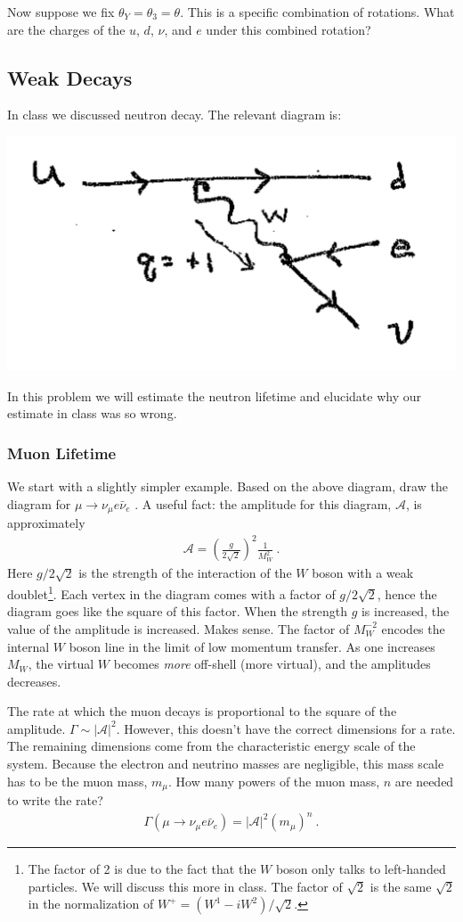 \documentclass[12pt]{article}
\begin{document}
Now suppose we fix $\theta_Y = \theta_3 =\theta$. This is a specific combination of rotations. What are the charges of the $u$, $d$, $\nu$, and $e$ under this combined rotation? 

 
\subsection{Weak Decays}

In class we discussed neutron decay. The relevant diagram is:
\begin{center}
	\includegraphics[width=.4\textwidth]{HW2b.png}
\end{center}
In this problem we will estimate the neutron lifetime and elucidate why our estimate in class was so wrong.

\subsubsection{Muon Lifetime}

We start with a slightly simpler example. Based on the above diagram, draw the diagram for $\mu \to \nu_\mu e \bar\nu_e$ . A useful fact: the amplitude for this diagram, $\mathcal A$, is approximately
\begin{align}
	\mathcal A = \left(\frac{g}{2\sqrt{2}}\right)^2 \frac{1}{M_W^2} \ .
\end{align}
Here $g/2\sqrt{2}$ is the strength of the interaction of the $W$ boson with a weak doublet\footnote{The factor of 2 is due to the fact that the $W$ boson only talks to left-handed particles. We will discuss this more in class. The factor of $\sqrt{2}$ is the same $\sqrt{2}$ in the normalization of $W^+ = (W^1 - iW^2)/\sqrt{2}$.}. Each vertex in the diagram comes with a factor of $g/2\sqrt{2}$, hence the diagram goes like the square of this factor. When the strength $g$ is increased, the value of the amplitude is increased. Makes sense. The factor of $M_W^{-2}$ encodes the internal $W$ boson line in the limit of low momentum transfer. As one increases $M_W$, the virtual $W$ becomes \emph{more} off-shell (more virtual), and the amplitudes decreases. 

The rate at which the muon decays is proportional to the square of the amplitude. $\Gamma \sim |\mathcal A|^2$. However, this doesn't have the correct dimensions for a rate. The remaining dimensions come from the characteristic energy scale of the system. Because the electron and neutrino masses are negligible, this mass scale has to be the muon mass, $m_\mu$. How many powers of the muon mass, $n$ are needed to write the rate?
\begin{align}
	\Gamma(\mu\to \nu_\mu e\bar\nu_e) = |\mathcal A|^2 (m_\mu)^n \ .
\end{align}
\end{document}
